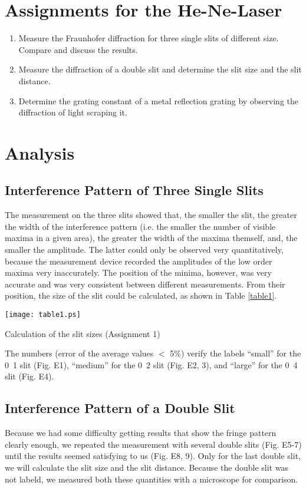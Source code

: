 \documentclass[a4paper,10pt]{article}
\begin{document}
\clearpage

\section{Assignments for the He-Ne-Laser}
\begin{enumerate}
\item Measure the Fraunhofer diffraction for three single slits of different size. Compare and discuss the results.
\item Measure the diffraction of a double slit and determine the slit size and the slit distance.
\item Determine the grating constant of a metal reflection grating by observing the diffraction of light scraping it.
\end{enumerate}




\section{Analysis}

\subsection{Interference Pattern of Three Single Slits}
The measurement on the three slits showed that, the smaller the slit, the greater the width of the interference pattern (i.e. the smaller the number of visible maxima in a given area), the greater the width of the maxima themself, and, the smaller the amplitude. The latter could only be observed very quantitatively, because the measurement device recorded the amplitudes of the low order maxima very inaccurately. The position of the minima, however, was very accurate and was very consistent between different measurements. From their position, the size of the slit could be calculated, as shown in Table \ref{table1}.
\begin{table}[htbp]
    \centering
    \texttt{[image: table1.ps]}
\caption{Calculation of the slit sizes (Assignment 1)}
\label{table1}
\end{table}
The numbers (error of the average values $<$ 5\%) verify the labels ``small'' for the \unit{0.1}{\milli\meter} slit (Fig. E1), ``medium'' for the \unit{0.2}{\milli\meter} slit (Fig. E2, 3), and ``large'' for the \unit{0.4}{\milli\meter} slit (Fig. E4).

\subsection{Interference Pattern of a Double Slit}
Because we had some difficulty getting results that show the fringe pattern clearly enough, we repeated the measurement with several double slits (Fig. E5-7)  until the results seemed satisfying to us (Fig. E8, 9). Only for the last double slit, we will calculate the slit size and the slit distance. Because the double slit was not labeld, we measured both these quantities with a microscope for comparison.
\end{document}
